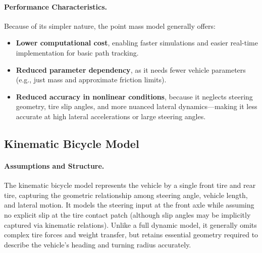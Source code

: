 \paragraph{Performance Characteristics.}
Because of its simpler nature, the point mass model generally offers:
\begin{itemize}
	\item \textbf{Lower computational cost}, enabling faster simulations and
	      easier real-time implementation for basic path tracking.
	\item \textbf{Reduced parameter dependency}, as it needs fewer vehicle
	      parameters (e.g., just mass and approximate friction limits).
	\item \textbf{Reduced accuracy in nonlinear conditions}, because it neglects
	      steering geometry, tire slip angles, and more nuanced lateral
	      dynamics---making it less accurate at high lateral accelerations
	      or large steering angles.
\end{itemize}

\subsection*{Kinematic Bicycle Model}

\paragraph{Assumptions and Structure.}
The kinematic bicycle model represents the vehicle by a single front tire and rear tire, capturing the geometric relationship among steering angle,
vehicle length, and lateral motion.
It models the steering input at the front axle while assuming no explicit slip at the tire contact patch (although slip angles may be implicitly
captured via kinematic relations).
Unlike a full dynamic model, it generally omits complex tire forces and weight transfer, but retains essential geometry required to describe the
vehicle's heading and turning radius accurately.

